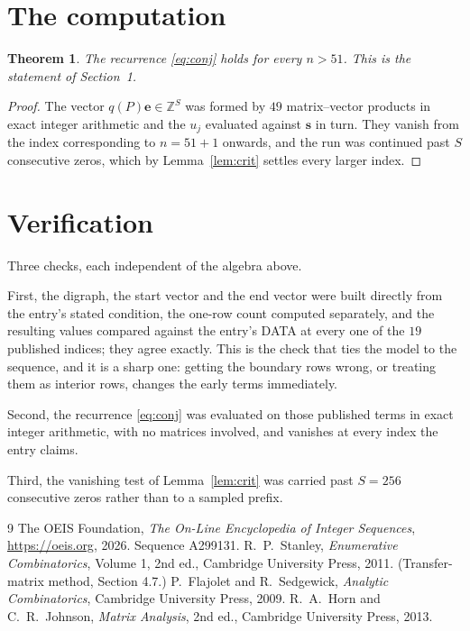 \documentclass[11pt,a4paper]{article}
\theoremstyle{plain}
\newtheorem{theorem}{Theorem}
\theoremstyle{definition}
\begin{document}
\section{The computation}

\begin{theorem}
The recurrence \eqref{eq:conj} holds for every $n>51$. This is the statement of
Section~1.
\end{theorem}

\begin{proof}
The vector $q(P)\mathbf{e}\in\mathbb{Z}^{S}$ was formed by $49$ matrix--vector
products in exact integer arithmetic and the $u_j$ evaluated against $\mathbf{s}$ in turn.
They vanish from the index corresponding to $n=51+1$ onwards, and the run was continued
past $S$ consecutive zeros, which by Lemma~\ref{lem:crit} settles every larger index.
\end{proof}

\section{Verification}

Three checks, each independent of the algebra above.

First, the digraph, the start vector and the end vector were built directly from the
entry's stated condition, the one-row count computed separately, and the resulting values
compared against the entry's DATA at every one of the $19$ published indices; they
agree exactly. This is the check that ties the model to the sequence, and it is a sharp one:
getting the boundary rows wrong, or treating them as interior rows, changes the early terms
immediately.

Second, the recurrence \eqref{eq:conj} was evaluated on those published terms in exact
integer arithmetic, with no matrices involved, and vanishes at every index the entry claims.

Third, the vanishing test of Lemma~\ref{lem:crit} was carried past $S=256$ consecutive
zeros rather than to a sampled prefix.

\begin{thebibliography}{9}
 The OEIS Foundation, \emph{The On-Line Encyclopedia of Integer
Sequences}, \url{https://oeis.org}, 2026. Sequence A299131.
 R.~P.~Stanley, \emph{Enumerative Combinatorics}, Volume 1, 2nd ed.,
Cambridge University Press, 2011. (Transfer-matrix method, Section 4.7.)
 P.~Flajolet and R.~Sedgewick, \emph{Analytic Combinatorics}, Cambridge
University Press, 2009.
 R.~A.~Horn and C.~R.~Johnson, \emph{Matrix Analysis}, 2nd ed., Cambridge
University Press, 2013.
\end{thebibliography}
\end{document}
